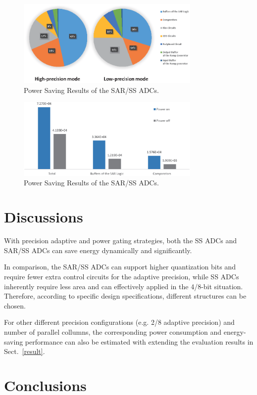 \documentclass[conference]{IEEEtran}
\begin{document}
\begin{figure}[htbp]
	\centerline{\includegraphics[width=3.5in]{./Figures/SARResults1.eps}}
	\caption{Power Saving Results of the SAR/SS ADCs.}
	\label{SARresults1}
\end{figure} 
\begin{figure}[htbp]
	\centerline{\includegraphics[width=3.5in]{./Figures/SARResults2.eps}}
	\caption{Power Saving Results of the SAR/SS ADCs.}
	\label{SARresults2}
\end{figure} 

\section{Discussions}\label{discussion}
With precision adaptive and power gating strategies, both the SS ADCs and SAR/SS ADCs can save energy dynamically and significantly. 

In comparison, the SAR/SS ADCs can support higher quantization bits and require fewer extra control circuits for the adaptive precision, while SS ADCs inherently require less area and can effectively applied in the 4/8-bit situation. Therefore, according to specific design specifications, different structures can be chosen. 

For other different precision configurations (e.g. 2/8 adaptive precision) and number of parallel collumns, the corresponding power consumption and energy-saving performance can also be estimated with extending the evaluation results in Sect.~\ref{result}. 

\section{Conclusions}\label{conclusion}
\end{document}
